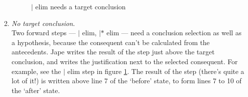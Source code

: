 \documentclass[11pt]{book}
\newcommand{\figref}[1]{figure \ref{fig:#1}}
\begin{document}
\begin{enumerate}
\begin{figure}
{  }
\caption{$|$ elim needs a target conclusion}
\label{fig:velimneedstargetconclusion}
\end{figure}

\item \emph{No target conclusion}.\\
Two forward steps --- $|$ elim, $|*$ elim --- need a conclusion selection as well as a hypothesis, because the consequent can't be calculated from the antecedents. Jape writes the result of the step just above the target conclusion, and writes the justification next to the selected consequent. For example, see the $|$ elim step 
in \figref{velimneedstargetconclusion}. The result of the step (there's quite a lot of it!) is written above line 7 of the `before' state, to form lines 7 to 10 of the `after' state.


\end{enumerate}
\end{document}
